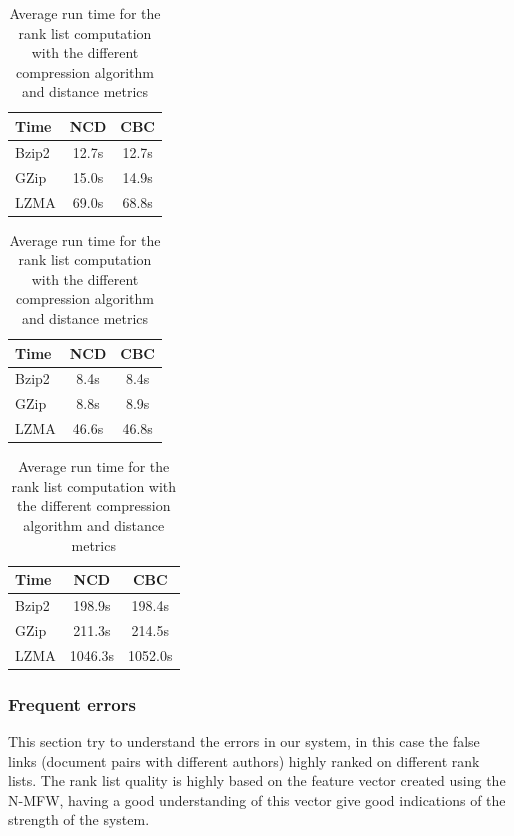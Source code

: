 \begin{table}
  \label{tab:compression_evaluation_time}
  \caption{Average run time for the rank list computation with the different compression algorithm and distance metrics}
  \centering

  \label{tab:compression_evaluation_time_oxquarry}
  \begin{tabular}{l c c}
    \toprule
    Time      & NCD   & CBC \\
    \midrule
    Bzip2     & 12.7s & 12.7s \\
    GZip      & 15.0s & 14.9s \\
    LZMA      & 69.0s & 68.8s \\
    \bottomrule
  \end{tabular}

  \label{tab:compression_evaluation_time_brunet}
  \begin{tabular}{l c c}
    \toprule
    Time      & NCD   & CBC \\
    \midrule
    Bzip2     & 8.4s & 8.4s \\
    GZip      & 8.8s & 8.9s \\
    LZMA      & 46.6s & 46.8s \\
    \bottomrule
  \end{tabular}

  \label{tab:compression_evaluation_time_st_jean}
  \begin{tabular}{l c c}
    \toprule
    Time      & NCD    & CBC \\
    \midrule
    Bzip2     & 198.9s  & 198.4s \\
    GZip      & 211.3s  & 214.5s \\
    LZMA      & 1046.3s & 1052.0s \\
    \bottomrule
  \end{tabular}
\end{table}


\subsubsection{Frequent errors}
\label{sec:frequent_errors}

This section try to understand the errors in our system, in this case the false links (document pairs with different authors) highly ranked on different rank lists.
The rank list quality is highly based on the feature vector created using the N-MFW, having a good understanding of this vector give good indications of the strength of the system.

